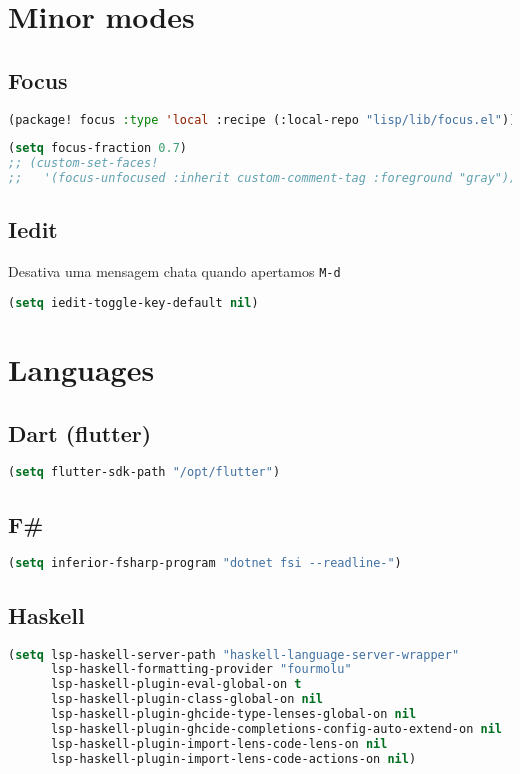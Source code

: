 \documentclass[11pt]{article}
\begin{document}
\section{Minor modes}
\label{sec:minor-modes}


\subsection{Focus}
\label{sec:focus}
\begin{lstlisting}[language=Lisp]
(package! focus :type 'local :recipe (:local-repo "lisp/lib/focus.el"))
\end{lstlisting}

\begin{lstlisting}[language=Lisp]
(setq focus-fraction 0.7)
;; (custom-set-faces!
;;   '(focus-unfocused :inherit custom-comment-tag :foreground "gray"))
\end{lstlisting}

\subsection{Iedit}
\label{sec:iedit}
Desativa uma mensagem chata quando apertamos \texttt{M-d}

\begin{lstlisting}[language=Lisp]
(setq iedit-toggle-key-default nil)
\end{lstlisting}


\section{Languages}
\label{sec:languages}


\subsection{Dart (flutter)}
\label{sec:dart-flutter}
\begin{lstlisting}[language=Lisp]
(setq flutter-sdk-path "/opt/flutter")
\end{lstlisting}

\subsection{F\#}
\label{sec:f}
\begin{lstlisting}[language=Lisp]
(setq inferior-fsharp-program "dotnet fsi --readline-")
\end{lstlisting}

\subsection{Haskell}
\label{sec:haskell}
\begin{lstlisting}[language=Lisp]
(setq lsp-haskell-server-path "haskell-language-server-wrapper"
      lsp-haskell-formatting-provider "fourmolu"
      lsp-haskell-plugin-eval-global-on t
      lsp-haskell-plugin-class-global-on nil
      lsp-haskell-plugin-ghcide-type-lenses-global-on nil
      lsp-haskell-plugin-ghcide-completions-config-auto-extend-on nil
      lsp-haskell-plugin-import-lens-code-lens-on nil
      lsp-haskell-plugin-import-lens-code-actions-on nil)
\end{lstlisting}
\end{document}
